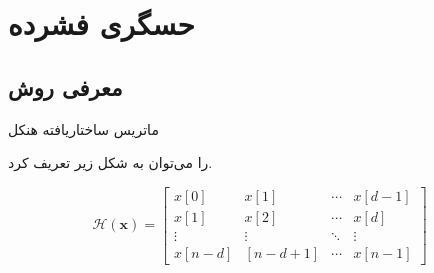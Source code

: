 \section{حسگری فشرده}\label{ch:literature-review|sec:compressed-sensing}








\subsection{معرفی روش }\label{ch:literature-review|sec:compressed-sensing|subsec:aloha}


ماتریس ساختاریافته هنکل

را می‌توان به شکل زیر تعریف کرد.

\begin{equation}\label{eq:HankelStructuredMatrix}
	\mathcal{H}(\mathbf{x})=
	\left[\begin{array}{cccc}
		x[0] & x[1] & \cdots & x[d-1] \\
		x[1] & x[2] & \cdots & x[d] \\
		\vdots & \vdots & \ddots & \vdots \\
		x[n-d] & {[n-d+1]} & \cdots & x[n-1]
	\end{array}\right]
\end{equation}



